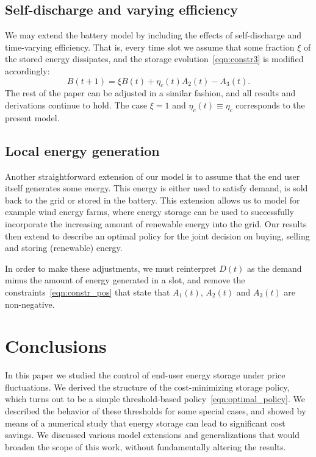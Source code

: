 \documentclass[journal]{IEEEtran}
\newcommand\1{\mathbf{1}}
\begin{document}
\subsection{Self-discharge and varying efficiency}

We may extend the battery model by including the effects of self-discharge and time-varying efficiency. That is, every time slot we assume that some fraction $\xi$ of the stored energy dissipates, and the storage evolution~\eqref{eqn:constr3} is modified accordingly:
\begin{equation*}
B(t+1) = \xi B(t) + \eta_c(t) A_2(t) - A_3(t).
\end{equation*}
The rest of the paper can be adjusted in a similar fashion, and all results and derivations continue to hold. The case $\xi = 1$ and $\eta_c(t) \equiv \eta_c$ corresponds to the present model.

\subsection{Local energy generation}

Another straightforward extension of our model is to assume that the end user itself generates some energy. This energy is either used to satisfy demand, is sold back to the grid or stored in the battery. This extension allows us to model for example wind energy farms, where energy storage can be used to successfully incorporate the increasing amount of renewable energy into the grid. Our results then extend to describe an optimal policy for the joint decision on buying, selling and storing (renewable) energy.

In order to make these adjustments, we must reinterpret $D(t)$ as the demand minus the amount of energy generated in a slot, and remove the constraints~\eqref{eqn:constr_pos} that state that $A_1(t)$, $A_2(t)$ and $A_3(t)$ are non-negative.






\section{Conclusions}\label{sec:conclusions}

In this paper we studied the control of end-user energy storage under price fluctuations. We derived the structure of the cost-minimizing storage policy, which turns out to be a simple threshold-based policy~\eqref{eqn:optimal_policy}. We described the behavior of these thresholds for some special cases, and showed by means of a numerical study that energy storage can lead to significant cost savings. We discussed various model extensions and generalizations that would broaden the scope of this work, without fundamentally altering the results.
\end{document}

